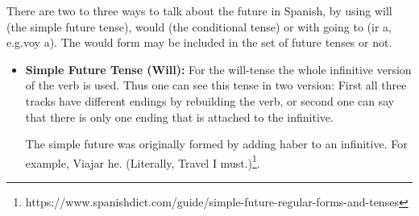 \documentclass[a4paper,12pt]{article}
\begin{document}
There are two to three ways to talk about the future in Spanish, by using \textsf{will} (the simple
future tense), \textsf{would} (the conditional tense) or with \textsf{going to} (\textsf{ir a},
e.g.\@ \textsf{voy a}). The \textsf{would} form may be included in the set of future tenses or not.

\begin{itemize}
\item \textbf{Simple Future Tense (Will):} For the will-tense the whole infinitive version of the
  verb is used. Thus one can see this tense in two version: First all three tracks have different
  endings by rebuilding the verb, or second one can say that there is only one ending that is
  attached to the infinitive.

  The simple future was originally formed by adding \textsf{haber} to an infinitive. For example,
  \textsf{Viajar he}. (Literally, Travel I
  must.)\footnote{https://www.spanishdict.com/guide/simple-future-regular-forms-and-tenses}.



\end{itemize}
\end{document}
